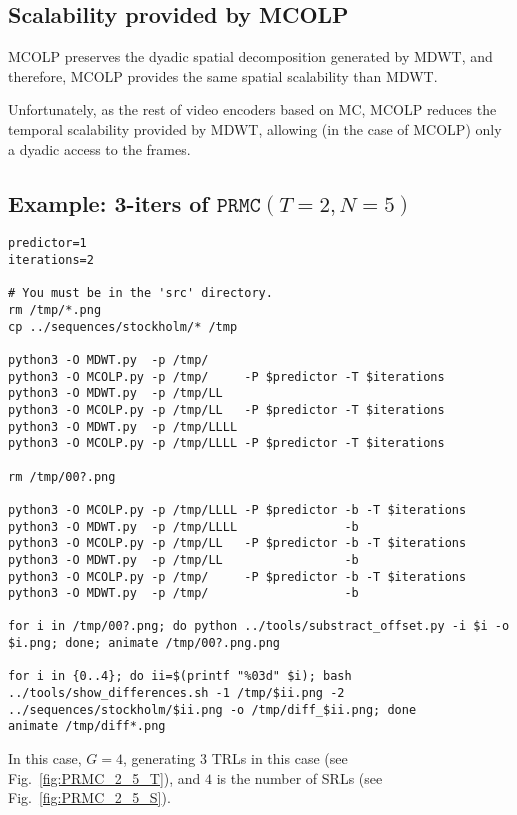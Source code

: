 
\subsection{Scalability provided by MCOLP}

MCOLP preserves the dyadic spatial decomposition generated by MDWT,
and therefore, MCOLP provides the same spatial scalability than MDWT.

Unfortunately, as the rest of video encoders based on MC, MCOLP
reduces the temporal scalability provided by MDWT, allowing (in the
case of MCOLP) only a dyadic access to the frames.


\subsection*{Example: 3-iters of $\mathtt{PRMC}(T=2, N=5)$}

\begin{verbatim}
predictor=1
iterations=2

# You must be in the 'src' directory.
rm /tmp/*.png
cp ../sequences/stockholm/* /tmp

python3 -O MDWT.py  -p /tmp/
python3 -O MCOLP.py -p /tmp/     -P $predictor -T $iterations
python3 -O MDWT.py  -p /tmp/LL
python3 -O MCOLP.py -p /tmp/LL   -P $predictor -T $iterations
python3 -O MDWT.py  -p /tmp/LLLL
python3 -O MCOLP.py -p /tmp/LLLL -P $predictor -T $iterations

rm /tmp/00?.png

python3 -O MCOLP.py -p /tmp/LLLL -P $predictor -b -T $iterations
python3 -O MDWT.py  -p /tmp/LLLL               -b
python3 -O MCOLP.py -p /tmp/LL   -P $predictor -b -T $iterations
python3 -O MDWT.py  -p /tmp/LL                 -b
python3 -O MCOLP.py -p /tmp/     -P $predictor -b -T $iterations
python3 -O MDWT.py  -p /tmp/                   -b

for i in /tmp/00?.png; do python ../tools/substract_offset.py -i $i -o $i.png; done; animate /tmp/00?.png.png

for i in {0..4}; do ii=$(printf "%03d" $i); bash ../tools/show_differences.sh -1 /tmp/$ii.png -2 ../sequences/stockholm/$ii.png -o /tmp/diff_$ii.png; done
animate /tmp/diff*.png
\end{verbatim}

In this case, $G=4$, generating $3$ TRLs in this case (see
Fig.~\ref{fig:PRMC_2_5_T}), and $4$ is the number of SRLs (see
Fig.~\ref{fig:PRMC_2_5_S}).

